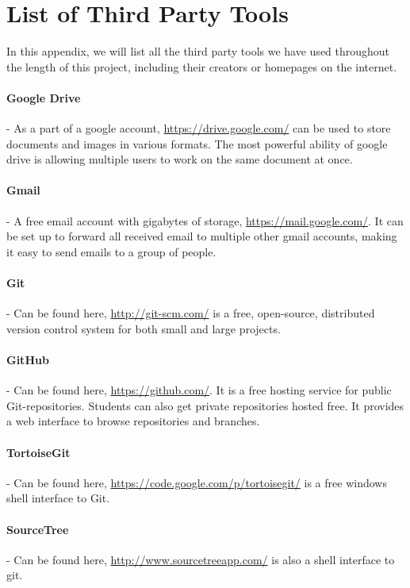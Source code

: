 \documentclass[../document]{subfiles}
\begin{document}
 

\section{List of Third Party Tools}
\label{third_party_tools}

In this appendix, we will list all the third party tools we have used throughout the length of this project, including their creators or homepages on the internet.

\paragraph{Google Drive} - As a part of a google account, \url{https://drive.google.com/} can be used to store documents and images in various formats. The most powerful ability of google drive is allowing multiple users to work on the same document at once.

\paragraph{Gmail} - A free email account with gigabytes of storage, \url{https://mail.google.com/}. It can be set up to forward all received email to multiple other gmail accounts, making it easy to send emails to a group of people.

\paragraph{Git} - Can be found here, \url{http://git-scm.com/} is a free, open-source, distributed version control system for both small and large projects.

\paragraph{GitHub} - Can be found here, \url{https://github.com/}. It is a free hosting service for public Git-repositories. Students can also get private repositories hosted free. It provides a web interface to browse repositories and branches.

\paragraph{TortoiseGit} - Can be found here, \url{https://code.google.com/p/tortoisegit/} is a free windows shell interface to Git.

\paragraph{SourceTree} - Can be found here, \url{http://www.sourcetreeapp.com/} is also a shell interface to git.
\end{document}
